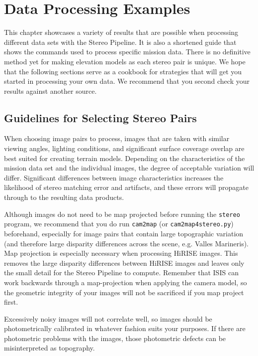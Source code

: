 \chapter{Data Processing Examples}
\label{ch:examples}


This chapter showcases a variety of results that are possible when
processing different data sets with the Stereo Pipeline. It is also a
shortened guide that shows the commands used to process specific
mission data. There is no definitive method yet for making elevation
models as each stereo pair is unique. We hope that the following
sections serve as a cookbook for strategies that will get you started
in processing your own data. We recommend that you second check your
results against another source.

\section{Guidelines for Selecting Stereo Pairs}

When choosing image pairs to process, images that are taken with
similar viewing angles, lighting conditions, and significant surface
coverage overlap are best suited for creating terrain
models. Depending on the characteristics of the mission data set and
the individual images, the degree of acceptable variation will
differ. Significant differences between image characteristics
increases the likelihood of stereo matching error and artifacts, and
these errors will propagate through to the resulting data products.

Although images do not need to be map projected before running the
\texttt{stereo} program, we recommend that you do run {\tt cam2map}
(or \texttt{cam2map4stereo.py})
beforehand, especially for image pairs that contain large topographic
variation (and therefore large disparity differences across the
scene, e.g. Valles Marineris).  Map projection is especially necessary
when processing \ac{HiRISE} images. This removes the large disparity
differences between \ac{HiRISE} images and leaves only the small
detail for the Stereo Pipeline to compute. Remember that \ac{ISIS}
can work backwards through a map-projection when applying the camera
model, so the geometric integrity of your images will not be sacrificed
if you map project first.

Excessively noisy images will not correlate well, so images should be
photometrically calibrated in whatever fashion suits your purposes. If
there are photometric problems with the images, those photometric
defects can be misinterpreted as topography.

